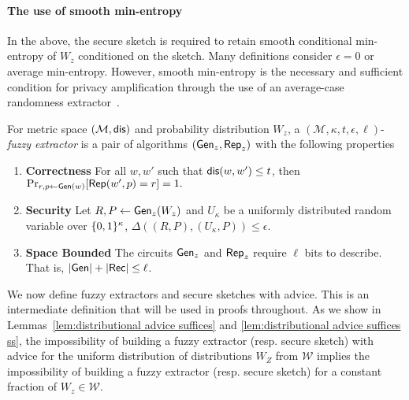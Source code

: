 \paragraph{The use of smooth min-entropy} In the above, the secure sketch is required to retain smooth conditional min-entropy of $W_z$ conditioned on the sketch.  Many definitions consider $\epsilon=0$ or average min-entropy.  However, smooth min-entropy is the necessary and sufficient condition for privacy amplification through the use of an average-case randomness extractor~\cite{renner2005simple}.

\begin{definition}
For metric space $(\mathcal{M}, \mathsf{dis})$ and probability distribution $W_z$, a $(\mathcal{M}, \kappa, t, \epsilon, \ell)$-\emph{fuzzy extractor} is a pair of algorithms $({\mathsf{Gen}}_z, {\mathsf{Rep}}_z)$ with the following properties 
\begin{enumerate} 
\itemsep0em
\item \textbf{Correctness} For all $w, w'$ such that $\mathsf{dis}(w, w')\le t$, then 
$\Pr_{r, p \leftarrow {\ensuremath{\mathsf{Gen}}}(w)}[{\mathsf{Rep}}(w', p) = r]=1.$ 
\item \textbf{Security} Let $R, P \leftarrow {\ensuremath{\mathsf{Gen}}}_z(W_z)$ and $U_\kappa$ be a uniformly distributed random variable over $\{0, 1\}^\kappa$, $\Delta((R, P), (U_\kappa, P))\le \epsilon.$
\item  \textbf{Space Bounded} The circuits ${\mathsf{Gen}}_z$ and ${\mathsf{Rep}}_z$ require $\ell$ bits to describe.  That is, $|{\mathsf{Gen}}| +|{\mathsf{Rec}}|\le \ell$.
\end{enumerate}
\label{def:fe}
\end{definition}

\noindent
We now define fuzzy extractors and secure sketches with advice.  This is an intermediate definition that will be used in proofs throughout.  As we show in Lemmas~\ref{lem:distributional advice suffices} and \ref{lem:distributional advice suffices ss}, the impossibility of building a fuzzy extractor (resp. secure sketch) with advice for the uniform distribution of distributions $W_Z$ from $\mathcal{W}$ implies the impossibility of building a fuzzy extractor (resp. secure sketch) for a constant fraction of $W_z\in\mathcal{W}$.

